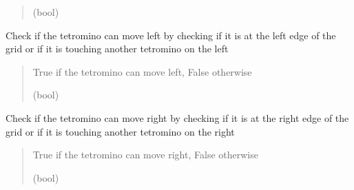 \documentclass[letterpaper,10pt,english]{sphinxmanual}
\begin{document}
\begin{fulllineitems}
\begin{fulllineitems}
\begin{quote}
\begin{description}
\sphinxAtStartPar
(bool)

\end{description}\end{quote}

\end{fulllineitems}


\begin{fulllineitems}
\label{\detokenize{tetrominos:tetrominos.Tetromino.check_move_left}}
\pysigstartsignatures
{}
\pysigstopsignatures
\sphinxAtStartPar
Check if the tetromino can move left by checking if it is at the left edge of the grid or if it is touching another tetromino on the left
\begin{quote}\begin{description}
\sphinxAtStartPar
True if the tetromino can move left, False otherwise

\sphinxAtStartPar
(bool)

\end{description}\end{quote}

\end{fulllineitems}


\begin{fulllineitems}
\label{\detokenize{tetrominos:tetrominos.Tetromino.check_move_right}}
\pysigstartsignatures
{}
\pysigstopsignatures
\sphinxAtStartPar
Check if the tetromino can move right by checking if it is at the right edge of the grid or if it is touching another tetromino on the right
\begin{quote}\begin{description}
\sphinxAtStartPar
True if the tetromino can move right, False otherwise

\sphinxAtStartPar
(bool)

\end{description}\end{quote}


\end{fulllineitems}
\end{fulllineitems}
\end{document}
